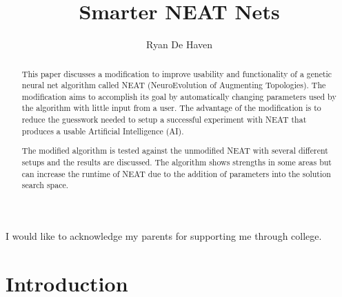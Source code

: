 \documentclass[12pt]{ucthesis} \newif\ifpdf \ifx\pdfoutput\undefined
\begin{document}
\title{Smarter NEAT Nets}

\author{Ryan De Haven}
  
 
  
 


\maketitle

\begin{frontmatter}

\copyrightpage

\approvalpage

 
\begin{abstract}
This paper discusses a modification to improve usability and functionality of a
genetic neural net algorithm called NEAT (NeuroEvolution of Augmenting
Topologies). The modification aims to accomplish its goal by automatically changing parameters used by the algorithm with little
input from a user. The advantage of the modification is to reduce the guesswork
needed to setup a successful experiment with NEAT that produces a usable
Artificial Intelligence (AI).

The modified algorithm is tested against the unmodified NEAT with several
different setups and the results are discussed. The algorithm shows strengths in
some areas but can increase the runtime of NEAT due to the addition of parameters into the
solution search space.

\end{abstract}

\begin{acknowledgements}
I would like to acknowledge my parents for supporting me through college.
\end{acknowledgements}

\tableofcontents

\listoftables

\listoffigures

\end{frontmatter}

\pagestyle{plain}

\renewcommand{\baselinestretch}{1.66}


\chapter{Introduction}
\end{document}
